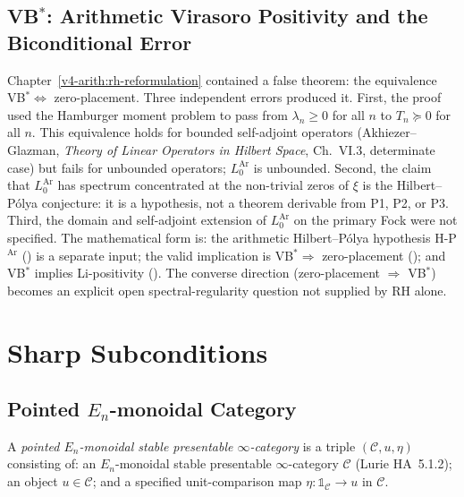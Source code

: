 \subsection{\texorpdfstring{VB\(^{*}\)}{VB*}: Arithmetic Virasoro Positivity and the Biconditional Error}

Chapter~\ref{v4-arith:rh-reformulation} contained a false theorem:
the equivalence VB\(^{*}\Leftrightarrow\) zero-placement.
Three independent errors produced it.
First, the proof used the Hamburger moment problem to pass from
\(\lambda_{n}\geq 0\) for all \(n\) to \(T_{n}\succeq 0\) for all \(n\).
This equivalence holds for bounded self-adjoint operators
(Akhiezer--Glazman, \emph{Theory of Linear Operators in Hilbert Space},
Ch.~VI.3, determinate case) but fails for unbounded operators;
\(L_{0}^{\mathrm{Ar}}\) is unbounded.
Second, the claim that \(L_{0}^{\mathrm{Ar}}\) has spectrum concentrated
at the non-trivial zeros of \(\xi\) is the Hilbert--P\'olya conjecture:
it is a hypothesis, not a theorem derivable from P1, P2, or P3.
Third, the domain and self-adjoint extension of \(L_{0}^{\mathrm{Ar}}\)
on the primary Fock were not specified.
The mathematical form is: the arithmetic Hilbert--P\'olya hypothesis
H-P\(^{\mathrm{Ar}}\) () is a separate
input; the valid implication is VB\(^{*}\Rightarrow\) zero-placement
(); and VB\(^{*}\) implies
Li-positivity
().
The converse direction (zero-placement \(\Rightarrow\) VB\(^{*}\))
becomes an explicit open spectral-regularity question not supplied by
RH alone.

\section{Sharp Subconditions}
\label{v4-arith:sw:corrections}

\subsection{Pointed \(E_{n}\)-monoidal Category}

\begin{definition}
\label{v4-arith:sw:def:pointed-En}
A \emph{pointed \(E_{n}\)-monoidal stable presentable \(\infty\)-category}
is a triple \((\mathcal{C},u,\eta)\) consisting of: an \(E_{n}\)-monoidal
stable presentable \(\infty\)-category \(\mathcal{C}\) (Lurie
HA~5.1.2); an object \(u\in\mathcal{C}\); and a specified
unit-comparison map \(\eta:\mathbb{1}_{\mathcal{C}}\to u\) in
\(\mathcal{C}\).
\end{definition}

